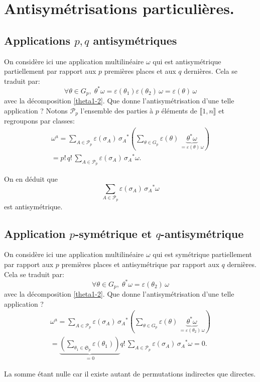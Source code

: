 \section*{Antisymétrisations particulières.}
\subsection*{Applications $p,q$ antisymétriques}
On considère ici une application multilinéaire $\omega$ qui est antisymétrique partiellement par rapport aux $p$ premières places et aux $q$ dernières. Cela se traduit par:
\[
 \forall \theta \in G_p,\; \theta^* \omega = \varepsilon(\theta_1) \varepsilon(\theta_2)\,\omega = \varepsilon(\theta)\, \omega
\]
avec la décomposition \ref{theta1-2}.\newline
Que donne l'antisymétrisation d'une telle application ?\newline
Notons $\mathcal{P}_p$ l'ensemble des parties à $p$ éléments de $\llbracket 1,n\rrbracket$ et regroupons par classes:
\begin{multline*}
 \omega^a = \sum_{A \in \mathcal{P}_p} \varepsilon(\sigma_A)\,{\sigma_A}^*\left( \sum_{\theta \in G_p}\varepsilon(\theta)\,\underset{=\varepsilon(\theta)\,\omega}{\underbrace{\theta^* \omega}}\right) \\
 = p!\,q!\,\sum_{A \in \mathcal{P}_p} \varepsilon(\sigma_A)\,{\sigma_A}^*\omega.
\end{multline*}

On en déduit que 
\[
 \sum_{A \in \mathcal{P}_p} \varepsilon(\sigma_A)\,{\sigma_A}^*\omega
\]
est antisymétrique.

\subsection*{Application $p$-symétrique et $q$-antisymétrique}
On considère ici une application multilinéaire $\omega$ qui est symétrique partiellement par rapport aux $p$ premières places et antisymétrique par rapport aux $q$ dernières. Cela se traduit par:
\[
 \forall \theta \in G_p,\; \theta^* \omega = \varepsilon(\theta_2)\,\omega
\]
avec la décomposition \ref{theta1-2}.\newline
Que donne l'antisymétrisation d'une telle application ?
\begin{multline*}
 \omega^a = \sum_{A \in \mathcal{P}_p} \varepsilon(\sigma_A)\,{\sigma_A}^*\left( \sum_{\theta \in G_p}\varepsilon(\theta)\,\underset{=\varepsilon(\theta_2)\,\omega}{\underbrace{\theta^* \omega}}\right) \\
 = \underset{ = 0}{\underbrace{\left( \sum_{\theta_1 \in \mathfrak{S}_p} \varepsilon(\theta_1)\right)}}q!\,\sum_{A \in \mathcal{P}_p} \varepsilon(\sigma_A)\,{\sigma_A}^* \omega
 = 0.
\end{multline*}

La somme étant nulle car il existe autant de permutations indirectes que directes.

